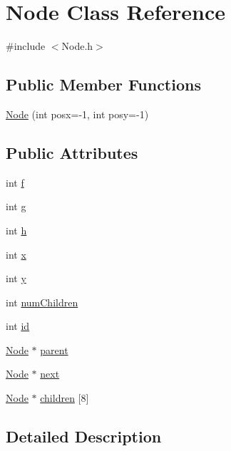 \hypertarget{class_node}{
\section{Node Class Reference}
\label{class_node}
}


{\ttfamily \#include $<$Node.h$>$}

\subsection*{Public Member Functions}
\begin{DoxyCompactItemize}
\item 
\hyperlink{class_node_aa059c5a44ee9833408f8efa087eeeee2}{Node} (int posx=-\/1, int posy=-\/1)
\end{DoxyCompactItemize}
\subsection*{Public Attributes}
\begin{DoxyCompactItemize}
\item 
int \hyperlink{class_node_a32fbe9e0f4fc9e9d1845ce808738d7ab}{f}
\item 
int \hyperlink{class_node_a0b249888eacdec6c623ec8c58b230c48}{g}
\item 
int \hyperlink{class_node_afb5a7ac7536a9e09488bb685420cd78a}{h}
\item 
int \hyperlink{class_node_aff1029a518bdc2651007b8856f958364}{x}
\item 
int \hyperlink{class_node_aa3e5b5240023b4528ae85057b3324202}{y}
\item 
int \hyperlink{class_node_a5037540b2e3d6349d66ea25b062b6aa8}{numChildren}
\item 
int \hyperlink{class_node_a59a543130a10c95f1e8642cf8c5645e8}{id}
\item 
\hyperlink{class_node}{Node} $\ast$ \hyperlink{class_node_ad8184598cdea70e4bbdfd76f2b0f9e85}{parent}
\item 
\hyperlink{class_node}{Node} $\ast$ \hyperlink{class_node_a2559a716f69ccaa76d648d9f1b83065e}{next}
\item 
\hyperlink{class_node}{Node} $\ast$ \hyperlink{class_node_a5ce833fd049e87166f1c7acb6a803fba}{children} \mbox{[}8\mbox{]}
\end{DoxyCompactItemize}


\subsection{Detailed Description}


